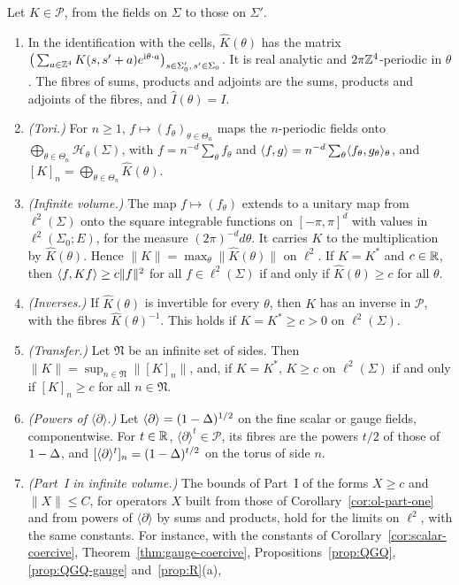 \begin{lemma}\label{lem:ol-bloch}
Let $K\in\mathscr P$, from the fields on $\Sigma$ to those on $\Sigma'$.
\begin{enumerate}[label=(\alph*)]
\item In the identification with the cells, $\hat K(\theta)$ has the matrix $\big(\sum_{a\in\mathbb Z^4}K(s,s'+a)e^{\mathrm i\theta\cdot a}\big)_{s\in\Sigma'_0,\,s'\in\Sigma_0}$. It is real analytic and $2\pi\mathbb Z^4$-periodic in $\theta$. The fibres of sums, products and adjoints are the sums, products and adjoints of the fibres, and $\hat I(\theta)=I$.
\item \emph{(Tori.)} For $n\ge1$, $f\mapsto(f_\theta)_{\theta\in\Theta_n}$ maps the $n$-periodic fields onto $\bigoplus_{\theta\in\Theta_n}\mathcal H_\theta(\Sigma)$, with $f=n^{-d}\sum_\theta f_\theta$ and $\langle f,g\rangle=n^{-d}\sum_\theta\langle f_\theta,g_\theta\rangle_\theta$, and $[K]_n=\bigoplus_{\theta\in\Theta_n}\hat K(\theta)$.
\item \emph{(Infinite volume.)} The map $f\mapsto(f_\theta)$ extends to a unitary map from $\ell^2(\Sigma)$ onto the square integrable functions on $[-\pi,\pi]^d$ with values in $\ell^2(\Sigma_0;E)$, for the measure $(2\pi)^{-d}d\theta$. It carries $K$ to the multiplication by $\hat K(\theta)$. Hence $\|K\|=\max_\theta\|\hat K(\theta)\|$ on $\ell^2$. If $K=K^*$ and $c\in\mathbb R$, then $\langle f,Kf\rangle\ge c\|f\|^2$ for all $f\in\ell^2(\Sigma)$ if and only if $\hat K(\theta)\ge c$ for all $\theta$.
\item \emph{(Inverses.)} If $\hat K(\theta)$ is invertible for every $\theta$, then $K$ has an inverse in $\mathscr P$, with the fibres $\hat K(\theta)^{-1}$. This holds if $K=K^*\ge c>0$ on $\ell^2(\Sigma)$.
\item \emph{(Transfer.)} Let $\mathfrak N$ be an infinite set of sides. Then $\|K\|=\sup_{n\in\mathfrak N}\|[K]_n\|$, and, if $K=K^*$, $K\ge c$ on $\ell^2(\Sigma)$ if and only if $[K]_n\ge c$ for all $n\in\mathfrak N$.
\item \emph{(Powers of $\langle\partial\rangle$.)} Let $\langle\partial\rangle=(1-\Delta)^{1/2}$ on the fine scalar or gauge fields, componentwise. For $t\in\mathbb R$, $\langle\partial\rangle^t\in\mathscr P$, its fibres are the powers $t/2$ of those of $1-\Delta$, and $[\langle\partial\rangle^t]_n=(1-\Delta)^{t/2}$ on the torus of side $n$.
\item \emph{(Part~I in infinite volume.)} The bounds of Part~I of the forms $X\ge c$ and $\|X\|\le C$, for operators $X$ built from those of Corollary~\ref{cor:ol-part-one} and from powers of $\langle\partial\rangle$ by sums and products, hold for the limits on $\ell^2$, with the same constants. For instance, with the constants of Corollary~\ref{cor:scalar-coercive}, Theorem~\ref{thm:gauge-coercive}, Propositions~\ref{prop:QGQ}, \ref{prop:QGQ-gauge} and~\ref{prop:R}(a),

\end{enumerate}
\end{lemma}
